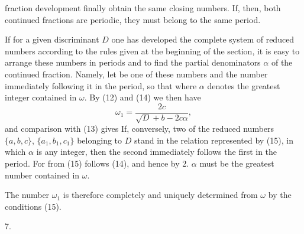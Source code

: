fraction development finally obtain the same closing numbers.
If, then, both continued fractions are periodic, they must belong
to the same period.

If for a given discriminant $D$ one has developed the complete
system of reduced numbers according to the rules given at the
beginning of the section, it is easy to arrange these numbers
in periods and to find the partial denominators $\alpha$ of the continued
fraction. Namely, let
be one of these numbers and
the number immediately following it in the period, so that
where $\alpha$ denotes the greatest integer contained in $\omega$.
By (12) and (14) we then have
\[
\omega_1 = \frac{2c}{\sqrt{D}+b-2c\alpha},
\]
and comparison with (13) gives
If, conversely, two of the reduced numbers $\{a, b, c\}$, $\{a_1, b_1, c_1\}$
belonging to $D$ stand in the relation represented by (15),
in which $\alpha$ is any integer, then the second immediately
follows the first in the period. For from (15)
follows (14), and hence by 2. $\alpha$ must be the greatest number
contained in $\omega$.

The number $\omega_1$ is therefore completely and uniquely determined
from $\omega$ by the conditions (15).

7. 
